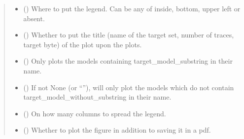 \documentclass[letterpaper,10pt,english]{sphinxmanual}
\begin{document}
\begin{fulllineitems}
\begin{fulllineitems}
\begin{quote}
\begin{description}
\begin{itemize}
\item {} 
\sphinxAtStartPar
{} (\sphinxstyleliteralemphasis{\sphinxupquote{, }}) \textendash{} Where to put the legend. Can be any of inside, bottom, upper left or absent.

\item {} 
\sphinxAtStartPar
{} (\sphinxstyleliteralemphasis{\sphinxupquote{, }}) \textendash{} Whether to put the title (name of the target set, number of traces, target byte) of the plot upon the plots.

\item {} 
\sphinxAtStartPar
{} (\sphinxstyleliteralemphasis{\sphinxupquote{, }}) \textendash{} Only plots the models containing target\_model\_substring in their name.

\item {} 
\sphinxAtStartPar
{} (\sphinxstyleliteralemphasis{\sphinxupquote{, }}) \textendash{} If not None (or “”), will only plot the models which do not contain target\_model\_without\_substring in
their name.

\item {} 
\sphinxAtStartPar
{} (\sphinxstyleliteralemphasis{\sphinxupquote{, }}) \textendash{} On how many columns to spread the legend.

\item {} 
\sphinxAtStartPar
{} (\sphinxstyleliteralemphasis{\sphinxupquote{, }}) \textendash{} Whether to plot the figure in addition to saving it in a pdf.


\end{itemize}
\end{description}
\end{quote}
\end{fulllineitems}
\end{fulllineitems}
\end{document}
